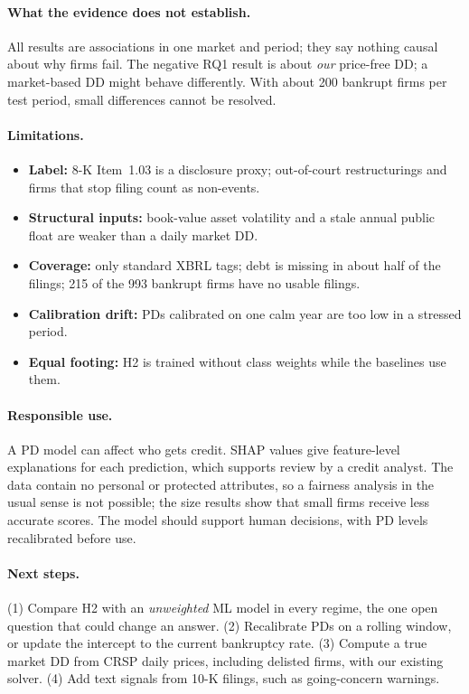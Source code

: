 \paragraph{What the evidence does not establish.} All results are associations in one market and period; they say
nothing causal about why firms fail. The negative RQ1 result is about \emph{our} price-free DD; a market-based DD
might behave differently. With about 200 bankrupt firms per test period, small differences cannot be resolved.

\paragraph{Limitations.}
\begin{itemize}
  \item \textbf{Label:} 8-K Item~1.03 is a disclosure proxy; out-of-court restructurings and firms that stop filing count as non-events.
  \item \textbf{Structural inputs:} book-value asset volatility and a stale annual public float are weaker than a daily market DD.
  \item \textbf{Coverage:} only standard XBRL tags; debt is missing in about half of the filings; 215 of the 993 bankrupt firms have no usable filings.
  \item \textbf{Calibration drift:} PDs calibrated on one calm year are too low in a stressed period.
  \item \textbf{Equal footing:} H2 is trained without class weights while the baselines use them.
\end{itemize}

\paragraph{Responsible use.} A PD model can affect who gets credit. SHAP values give feature-level explanations
for each prediction, which supports review by a credit analyst. The data contain no personal or protected
attributes, so a fairness analysis in the usual sense is not possible; the size results show that small firms
receive less accurate scores. The model should support human decisions, with PD levels recalibrated before use.

\paragraph{Next steps.} (1) Compare H2 with an \emph{unweighted} ML model in every regime, the one open question
that could change an answer. (2) Recalibrate PDs on a rolling window, or update the intercept to the current
bankruptcy rate. (3) Compute a true market DD from CRSP daily prices, including delisted firms, with our existing
solver. (4) Add text signals from 10-K filings, such as going-concern warnings.

